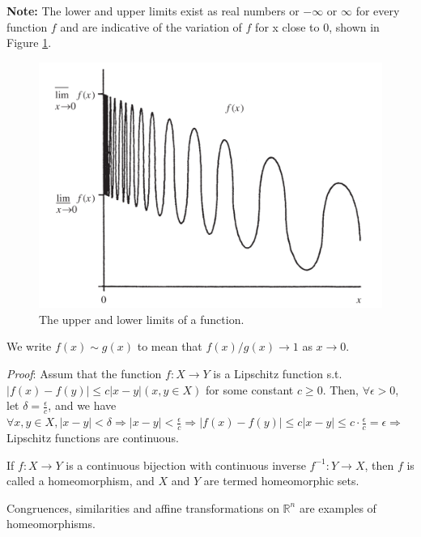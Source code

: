 \textbf{Note:} The lower and upper limits exist as real numbers or $-\infty$ or $\infty$ for 
every function $f$ and are indicative of the variation of $f$ for x close to 0, shown in Figure \ref{fig:lowerupperlimit}.

\begin{figure}[H]
    \centering
    \includegraphics[width=.66\textwidth]{images/limit1.png}
    \caption{The upper and lower limits of a function.}
    \label{fig:lowerupperlimit}
\end{figure}

We write $f(x) \sim g(x)$ to mean that $f(x) / g(x) \rightarrow 1$ as $x \rightarrow 0$.

\begin{theorem}\label{LipschitzContinuous}
\end{theorem}

\textit{Proof}: Assum that the function $f: X \rightarrow Y$ is a Lipschitz function s.t. 
$|f(x)-f(y)| \leq c|x-y| (x, y \in X)$ for some constant $c\geq 0$.
Then, $\forall \epsilon > 0$, let $\displaystyle \delta = \frac{\epsilon}{c}$, and we have
$\forall x, y\in X, |x-y| < \delta \Rightarrow \displaystyle |x-y| < \frac{\epsilon}{c} \Rightarrow |f(x) - f(y)| \leq c |x-y| \leq c\cdot \frac{\epsilon}{c} = \epsilon \Rightarrow$ Lipschitz functions are continuous.

\begin{definition}[Homeomorphism]
    If $f: X \rightarrow Y$ is a continuous bijection with continuous 
    inverse $f^{-1}: Y \rightarrow X$, then $f$ is called a homeomorphism, 
    and $X$ and $Y$ are termed homeomorphic sets. 
\end{definition}
\begin{corollary}
    Congruences, similarities 
    and affine transformations on $\mathbb{R}^{n}$ are examples of homeomorphisms.
\end{corollary}

